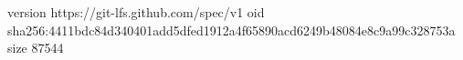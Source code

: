 version https://git-lfs.github.com/spec/v1
oid sha256:4411bdc84d340401add5dfed1912a4f65890acd6249b48084e8c9a99c328753a
size 87544
